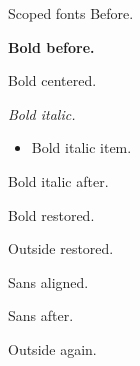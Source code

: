 \documentclass[10pt]{beamer}
\begin{document}
\begin{frame}[t]{Scoped fonts}
Before.\par
{\bfseries Bold before.\par\begin{center}Bold centered.\end{center}
{\itshape Bold italic.\par\begin{itemize}\item Bold italic item.\end{itemize}Bold italic after.\par}
Bold restored.\par}
Outside restored.\par
{\sffamily\begin{flushright}Sans aligned.\end{flushright}Sans after.\par}
Outside again.
\end{frame}
\end{document}
